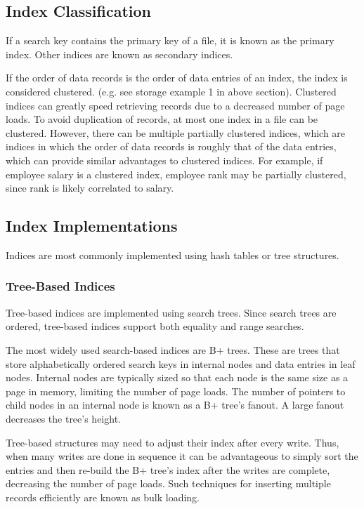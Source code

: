 \documentclass[12pt,titlepage]{article}
\begin{document}
    \subsection{Index Classification}
      If a search key contains the primary key of a file, it is known as the primary index. Other indices are known as secondary
      indices.

      If the order of data records is the order of data entries of an index, the index is considered clustered. (e.g. see storage
      example 1 in above section). Clustered indices can greatly speed retrieving records due to a decreased number of page loads.
      To avoid duplication of records, at most one index in a file can be clustered. However, there can be multiple partially
      clustered indices, which are indices in which the order of data records is roughly that of the data entries, which can provide
      similar advantages to clustered indices. For example, if employee salary is a clustered index, employee rank may be partially
      clustered, since rank is likely correlated to salary.

    \subsection{Index Implementations}
      Indices are most commonly implemented using hash tables or tree structures.

      \subsubsection{Tree-Based Indices}
        Tree-based indices are implemented using search trees. Since search trees are ordered, tree-based indices support both equality
        and range searches.

        The most widely used search-based indices are B+ trees. These are trees that store alphabetically ordered search keys in internal
        nodes and data entries in leaf nodes. Internal nodes are typically sized so that each node is the same size as a page in memory,
        limiting the number of page loads. The number of pointers to child nodes in an internal node is known as a B+ tree's fanout. A
        large fanout decreases the tree's height.

        Tree-based structures may need to adjust their index after every write. Thus, when many writes are done in sequence it can be
        advantageous to simply sort the entries and then re-build the B+ tree's index after the writes are complete, decreasing the number
        of page loads. Such techniques for inserting multiple records efficiently are known as bulk loading.
\end{document}
